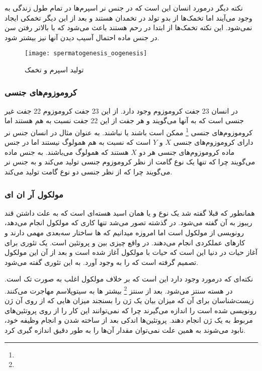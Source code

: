 نکته دیگر درمورد انسان این است که در جنس نر اسپرم‌ها در تمام طول زندگی به وجود می‌آیند اما تخمک‌ها از بدو تولد در تخمدان هستند و بعد از این دیگر تخمکی ایجاد نمی‌شود. این نکته تخمک‌ها از ابتدا در رحم هستند باعث می‌شود که با بالاتر رفتن سن در جنس ماده احتمال آسیب دیدن آنها نیز بیشتر شود.

\begin{figure}[htbp]
	\centering
	\texttt{[image: spermatogenesis\_oogenesis]}
	\caption{تولید اسپرم و تخمک}
	\label{figure:spermatogenesis}
\end{figure}

\subsubsection{کروموزوم‌های جنسی}
در انسان 23 جفت کروموزوم وجود دارد. از این 23 جفت کروموزوم 22 جفت غیر جنسی است که به آنها
می‌گویند
و هر جفت از این 22 جفت نسبت به هم
هستند اما کروموزوم‌های جنسی
\footnote{}
 ممکن است
باشند یا نباشند. به عنوان مثال در انسان جنس نر دارای کروموزوم‌های جنسی $ X $
و
$ Y $
است که نسبت به هم همولوگ نیستند اما در جنس ماده کروموزوم‌های جنسی
هر دو
$ X $
هستند که همولوگ می‌باشند.
به جنس ماده
می‌گویند چرا که تنها یک نوع گامت از نظر کروموزوم جنسی تولید می‌کند و به جنس نر
می‌گویند چرا که از نظر جنسی دو نوع گامت تولید می‌کند.

\pagebreak
\subsubsection{مولکول آر ان ای}
همانطور که قبلا گفته شد
یک نوع
و یا همان اسید هسته‌ای است که به علت داشتن قند ریبوز به آن
گفته می‌شود. در گذشته تصور می‌شد تنها کاری که مولکول
انجام می‌دهد، رونویسی از مولکول
است اما امروزه میدانیم که
ها ساختار سه‌بعدی مهمی دارند و کارهای عملکردی انجام می‌دهند. در واقع
چیزی بین
و پروتئین است. یک تئوری برای آغاز حیات در دنیا این است که حیات با مولکول
آغاز شده است و بعد از آن این مولکول تصمیم گرفته است که
را به وجود آورد. به این تئوری
گفته می‌شود.

نکته‌ای که درمورد
وجود دارد این است که بر خلاف مولکول
اغلب به صورت تک
است. 
در هسته سنتز می‌شود. بعد از سنتز
\footnote{}
بیشتر
ها به سیتوپلاسم مهاجرت می‌کنند. زیست‌شناسان برای آن که میزان بیان یک ژن را بسنجند میزان
هایی که از روی آن ژن رونویسی شده است را اندازه می‌گیرند چرا که نمی‌توانند این کار را از روی پروتئین‌های مربوط به یک ژن انجام دهند. پروتئین‌ها اندکی بعد از ساخته شدن و انجام وظیفه خود، نابود می‌شوند به همین علت نمی‌توان مقدار آن‌ها را به طور دقیق اندازه گیری کرد.

